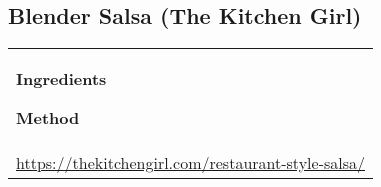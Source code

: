 \documentclass[../web-recipes.tex]{subfiles}
\begin{document}
    \renewcommand{\mytitle}{Blender Salsa (The Kitchen Girl)}
    \renewcommand{\myurl}{https://thekitchengirl.com/restaurant-style-salsa/}

    \begin{mdframed}[nobreak]
      \section{\mytitle}
      \begin{tabular}{l}
        \begin{minipage}[t]{0.35\textwidth}
          {\sffamily\bfseries Ingredients}\vspace{0.5ex}
          
        \end{minipage}
        \qquad
        \begin{minipage}[t]{0.55\textwidth}
          {\sffamily\bfseries Method}\vspace{0.5ex}
          
        \end{minipage} \vspace{3ex}\\
        \multicolumn{1}{c}{\small\ttfamily \url{\myurl}} \\
      \end{tabular}
    \end{mdframed}
    
\end{document}
